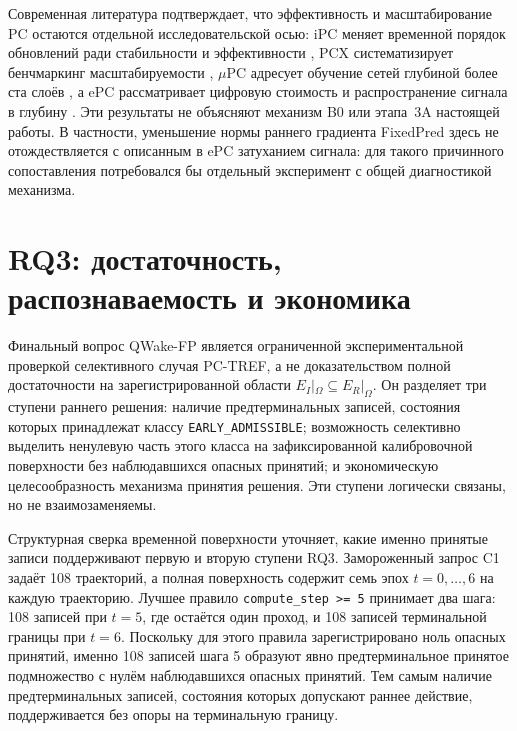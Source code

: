 Современная литература подтверждает, что эффективность и масштабирование PC
остаются отдельной исследовательской осью: iPC меняет временной
порядок обновлений ради стабильности и эффективности
\cite{salvatori2024stable}, PCX систематизирует бенчмаркинг масштабируемости
\cite{pinchetti2025benchmarking}, $\mu$PC адресует обучение сетей глубиной более
ста слоёв \cite{innocenti2025mupc}, а ePC рассматривает цифровую стоимость и
распространение сигнала в глубину \cite{goemaere2026epc}. Эти результаты не
объясняют механизм B0 или этапа~3A настоящей работы. В частности, уменьшение
нормы раннего градиента FixedPred здесь не отождествляется с описанным в ePC
затуханием сигнала: для такого причинного сопоставления потребовался бы отдельный
эксперимент с общей диагностикой механизма.

\section{RQ3: достаточность, распознаваемость и экономика}
\label{sec:discussion-rq3}

Финальный вопрос QWake-FP является ограниченной экспериментальной проверкой
селективного случая PC-TREF, а не доказательством полной достаточности на зарегистрированной области
$E_I|_\Omega\subseteq E_R|_\Omega$. Он разделяет три ступени раннего решения:
наличие предтерминальных записей, состояния которых принадлежат классу \texttt{EARLY\_ADMISSIBLE};
возможность селективно выделить ненулевую часть этого класса на зафиксированной
калибровочной поверхности без наблюдавшихся опасных принятий; и экономическую
целесообразность механизма принятия решения. Эти ступени логически связаны, но
не взаимозаменяемы.

Структурная сверка временной поверхности уточняет, какие именно принятые записи
поддерживают первую и вторую ступени RQ3. Замороженный запрос C1 задаёт 108
траекторий, а полная поверхность содержит семь эпох $t=0,\ldots,6$ на каждую
траекторию. Лучшее правило \texttt{compute\_step >= 5} принимает два шага:
108 записей при $t=5$, где остаётся один проход, и 108 записей терминальной
границы при $t=6$. Поскольку для этого правила зарегистрировано ноль опасных
принятий, именно 108 записей шага 5 образуют явно предтерминальное принятое
подмножество с нулём наблюдавшихся опасных принятий. Тем самым наличие
предтерминальных записей, состояния которых допускают раннее действие, поддерживается без
опоры на терминальную границу.

